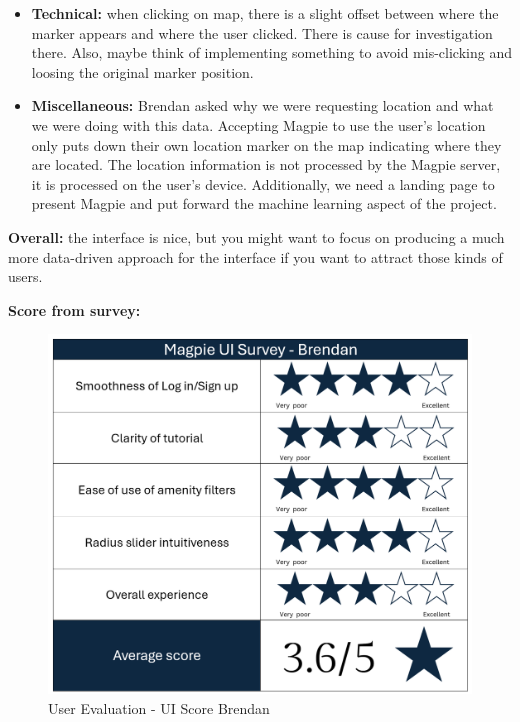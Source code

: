 \begin{itemize}
    \item \textbf{Technical: }when clicking on map, there is a slight offset
    between where the marker appears and where the user clicked. There is cause
    for investigation there. Also, maybe think of implementing something to
    avoid mis-clicking and loosing the original marker position.

    \newpage{}

    \item \textbf{Miscellaneous: }Brendan asked why we were requesting location
    and what we were doing with this data. Accepting Magpie to use the user's
    location only puts down their own location marker on the map indicating
    where they are located. The location information is not processed by the
    Magpie server, it is processed on the user's device. Additionally, we need
    a landing page to present Magpie and put forward the machine learning aspect
    of the project.
\end{itemize}

\textbf{Overall: }the interface is nice, but you might want to focus on
producing a much more data-driven approach for the interface if you want to
attract those kinds of users.

\textbf{Score from survey: }
\begin{figure}[h!]
    \centering
    \includegraphics[width=\textwidth]{images/survey-brendan.png}
    \caption{User Evaluation - UI Score Brendan}
\end{figure}

